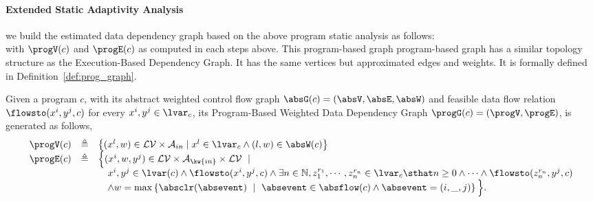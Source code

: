 \paragraph{Extended Static Adaptivity Analysis}
\label{sec:refine-static-adapt}
we build the estimated data dependency graph based on the above program static analysis as follows:
\\
\highlight{
  \[
    \progG(c) = (\progV(c), \progE(c))
    \]
}
with $\progV(c)$ and  $\progE(c)$
as computed in each steps above.
%
This program-based graph program-based graph has a similar topology structure as 
the Execution-Based Dependency Graph. It has the same
vertices 
but approximated edges and weights.  
It is formally defined in Definition~\ref{def:prog_graph}.
\begin{defn}
  \label{def:improved_prog_graph}
Given a program $c$, with its abstract weighted control flow graph $\absG(c) = (\absV, \absE, \absW)$ and 
feasible data flow relation $\flowsto(x^i, y^j, c)$ for every $x^i, y^j \in \lvar_c$, its Program-Based Weighted Data Dependency Graph
$\progG(c) = (\progV, \progE)$,
is generated as follows,
{\footnotesize
\[
\begin{array}{lcl}
\progV(c) & \triangleq &
\left\{ (x^l, w) \in  \mathcal{LV} \times \mathcal{A}_{in}
\mid
x^l \in \lvar_{{c}} \land (l, w) \in \absW(c)
\right\}
\\
\progE(c) & \triangleq &
   \Big\{ (x^i, w, y^j) \in \mathcal{LV} \times 
   \mathcal{A}_{\kw{in}} \times \mathcal{LV}
~\mid~
  \\ & & \quad 
x^i, y^j \in \lvar(c) \land \flowsto(x^i, y^j, c) \land
  \exists n \in \mathbb{N}, z_1^{r_1}, \cdots, z_n^{r_n} \in \lvar_{{c}} \sthat 
  n \geq 0 
  \land \cdots \land \flowsto(z_n^{r_n}, y^j, c) 
  \\ & & \quad 
  \land
  w = \max \left\{ \absclr(\absevent) ~\mid~ \absevent \in \absflow(c) \land \absevent = (i, \_, j) \right\} 
\Big\}.
\end{array}
\] }
\end{defn}
